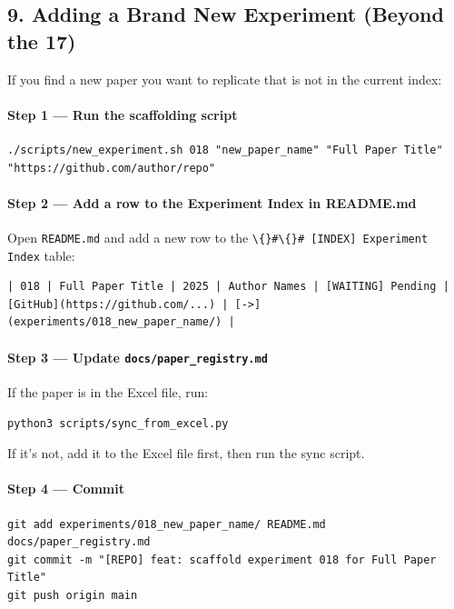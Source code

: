 \subsection{9. Adding a Brand New Experiment (Beyond the
17)}\label{adding-a-brand-new-experiment-beyond-the-17}

If you find a new paper you want to replicate that is not in the current
index:

\paragraph{Step 1 --- Run the scaffolding
script}\label{step-1-run-the-scaffolding-script}

\begin{verbatim}
./scripts/new_experiment.sh 018 "new_paper_name" "Full Paper Title" "https://github.com/author/repo"
\end{verbatim}

\paragraph{Step 2 --- Add a row to the Experiment Index in
README.md}\label{step-2-add-a-row-to-the-experiment-index-in-readme.md}

Open \texttt{README.md} and add a new row to the
\texttt{\textbackslash\{\}\#\textbackslash\{\}\# [INDEX] Experiment Index} table:

\begin{verbatim}
| 018 | Full Paper Title | 2025 | Author Names | [WAITING] Pending | [GitHub](https://github.com/...) | [->](experiments/018_new_paper_name/) |
\end{verbatim}

\paragraph{\texorpdfstring{Step 3 --- Update
\texttt{docs/paper\_registry.md}}{Step 3 --- Update docs/paper\_registry.md}}\label{step-3-update-docspaper_registry.md}

If the paper is in the Excel file, run:

\begin{verbatim}
python3 scripts/sync_from_excel.py
\end{verbatim}

If it's not, add it to the Excel file first, then run the sync script.

\paragraph{Step 4 --- Commit}\label{step-4-commit}

\begin{verbatim}
git add experiments/018_new_paper_name/ README.md docs/paper_registry.md
git commit -m "[REPO] feat: scaffold experiment 018 for Full Paper Title"
git push origin main
\end{verbatim}
